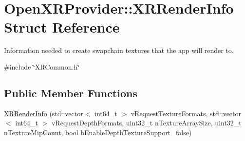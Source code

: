 \hypertarget{struct_open_x_r_provider_1_1_x_r_render_info}{}\section{Open\+X\+R\+Provider\+::X\+R\+Render\+Info Struct Reference}
\label{struct_open_x_r_provider_1_1_x_r_render_info}


Information needed to create swapchain textures that the app will render to.  




{\ttfamily \#include \char`\"{}X\+R\+Common.\+h\char`\"{}}

\subsection*{Public Member Functions}
\begin{DoxyCompactItemize}
\item 
\mbox{\hyperlink{struct_open_x_r_provider_1_1_x_r_render_info_a5ece658891cf75177b282d3db14b8f77}{X\+R\+Render\+Info}} (std\+::vector$<$ int64\+\_\+t $>$ v\+Request\+Texture\+Formats, std\+::vector$<$ int64\+\_\+t $>$ v\+Request\+Depth\+Formats, uint32\+\_\+t n\+Texture\+Array\+Size, uint32\+\_\+t n\+Texture\+Mip\+Count, bool b\+Enable\+Depth\+Texture\+Support=false)
\end{DoxyCompactItemize}
